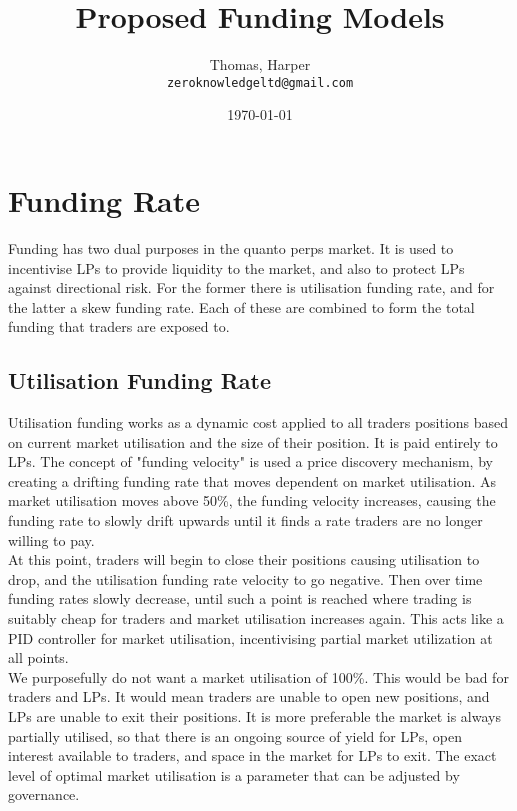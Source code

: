 \documentclass[]{article}
\title{Proposed Funding Models}
\author{
  Thomas, Harper\\
  \texttt{zeroknowledgeltd@gmail.com}
}
\date{\today}
\begin{document}
\maketitle

\section{Funding Rate}

Funding has two dual purposes in the quanto perps market. It is used to incentivise LPs to provide liquidity to the market, and also to protect LPs against directional risk. For the former there is utilisation funding rate, and for the latter a skew funding rate. Each of these are combined to form the total funding that traders are exposed to.

\subsection{Utilisation Funding Rate}

Utilisation funding works as a dynamic cost applied to all traders positions based on current market utilisation and the size of their position. It is paid entirely to LPs. The concept of "funding velocity" is used a price discovery mechanism, by creating a drifting funding rate that moves dependent on market utilisation. As market utilisation moves above 50\%, the funding velocity increases, causing the funding rate to slowly drift upwards until it finds a rate traders are no longer willing to pay.\\

At this point, traders will begin to close their positions causing utilisation to drop, and the utilisation funding rate velocity to go negative. Then over time funding rates slowly decrease, until such a point is reached where trading is suitably cheap for traders and market utilisation increases again. This acts like a PID controller for market utilisation, incentivising partial market utilization at all points.\\

We purposefully do not want a market utilisation of 100\%. This would be bad for traders and LPs. It would mean traders are unable to open new positions, and LPs are unable to exit their positions. It is more preferable the market is always partially utilised, so that there is an ongoing source of yield for LPs, open interest available to traders, and space in the market for LPs to exit. The exact level of optimal market utilisation is a parameter that can be adjusted by governance.\\
\end{document}

